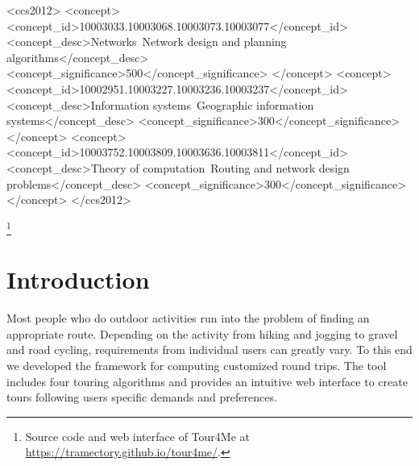 \documentclass[sigconf,natbib=false]{acmart}
\begin{document}
\begin{CCSXML}
<ccs2012>
   <concept>
       <concept_id>10003033.10003068.10003073.10003077</concept_id>
       <concept_desc>Networks~Network design and planning algorithms</concept_desc>
       <concept_significance>500</concept_significance>
       </concept>
   <concept>
       <concept_id>10002951.10003227.10003236.10003237</concept_id>
       <concept_desc>Information systems~Geographic information systems</concept_desc>
       <concept_significance>300</concept_significance>
       </concept>
   <concept>
       <concept_id>10003752.10003809.10003636.10003811</concept_id>
       <concept_desc>Theory of computation~Routing and network design problems</concept_desc>
       <concept_significance>300</concept_significance>
       </concept>
 </ccs2012>
\end{CCSXML}


\thanks{Source code and web interface of Tour4Me at \url{https://tramectory.github.io/tour4me/}.}

\maketitle

\section{Introduction}

Most people who do outdoor activities run into the problem of finding an appropriate route. 
Depending on the activity from hiking and jogging to gravel and road cycling, requirements from individual users can greatly vary.
To this end we developed the framework \tM for computing customized round trips. 
The tool \tM includes four touring algorithms and provides an intuitive web interface to create tours following users specific demands and preferences. 
\end{document}
